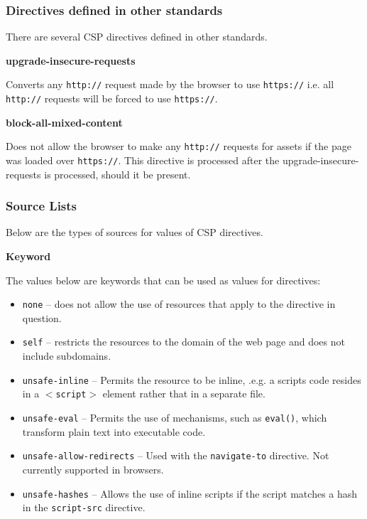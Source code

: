 \documentclass{mscreport}
\begin{document}
\clearpage

\subsubsection{Directives defined in other standards}

There are several CSP directives defined in other standards.

\vspace{0.7cm} \noindent
\textbf{upgrade-insecure-requests}

\vspace{0.3cm} \noindent
Converts any \texttt{http://} request made by the browser to use \texttt{https://} i.e. all \texttt{http://} requests will be forced to use \texttt{https://}.

\vspace{0.7cm} \noindent
\textbf{block-all-mixed-content}

\vspace{0.3cm} \noindent
Does not allow the browser to make any \texttt{http://} requests for assets if the page was loaded over \texttt{https://}. This directive is processed after the upgrade-insecure-requests is processed, should it be present.

\subsubsection{Source Lists}

Below are the types of sources for values of CSP directives.


\vspace{0.7cm} \noindent
\textbf{Keyword}

\vspace{0.3cm} \noindent
The values below are keywords that can be used as values for directives:
\begin{itemize}
	\setlength\itemsep{0.1em}
	\item \texttt{none} – does not allow the use of resources that apply to the directive in question.
	\item \texttt{self} – restricts the resources to the domain of the web page and does not include subdomains.
	\item \texttt{unsafe-inline} – Permits the resource to be inline, .e.g. a scripts code resides in a \texttt{$<$script$>$} element rather that in a separate file.
	\item \texttt{unsafe-eval} – Permits the use of mechanisms, such as \texttt{eval()}, which transform plain text into executable code.
	\item \texttt{unsafe-allow-redirects} – Used with the \texttt{navigate-to} directive. Not currently supported in browsers.
	\item \texttt{unsafe-hashes} – Allows the use of inline scripts if the script matches a hash in the \texttt{script-src} directive.
	
\end{itemize}
\end{document}
